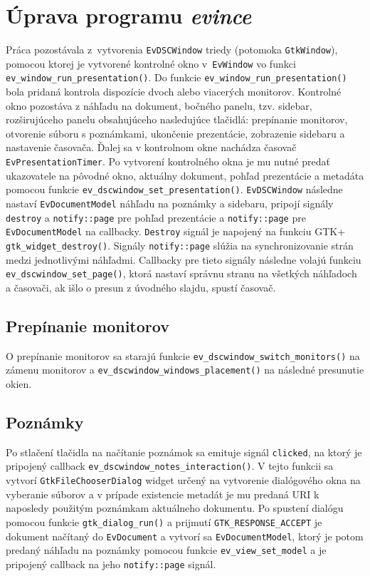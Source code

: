 \documentclass[12pt,oneside,final]{fithesis2}
\begin{document}
\chapter{Úprava programu \emph{evince}}
Práca pozostávala z~vytvorenia \texttt{EvDSCWindow} triedy (potomoka \texttt{GtkWindow}), pomocou ktorej je vytvorené kontrolné okno v~\texttt{EvWindow} vo funkci \texttt{ev\_window\_run\_presentation()}. Do funkcie \texttt{ev\_window\_run\_presentation()} bola pridaná kontrola dispozície dvoch alebo viacerých monitorov. Kontrolné okno pozostáva z náhľadu na dokument, bočného panelu, tzv. sidebar, rozširujúceho panelu obsahujúceho nasledujúce tlačidlá: prepínanie monitorov, otvorenie súboru s poznámkami, ukončenie prezentácie, zobrazenie sidebaru a nastavenie časovača. Ďalej sa v kontrolnom okne nachádza časovač \texttt{EvPresentationTimer}. Po vytvorení kontrolného okna je mu nutné predať ukazovatele na pôvodné okno, aktuálny dokument, pohľad prezentácie a metadáta pomocou funkcie \texttt{ev\_dscwindow\_set\_presentation()}. \texttt{EvDSCWindow} následne nastaví \texttt{EvDocumentModel} náhľadu na poznámky a sidebaru, pripojí signály \texttt{destroy} a \texttt{notify::page} pre pohľad prezentácie a \texttt{notify::page} pre \texttt{EvDocumentModel} na callbacky. \texttt{Destroy} signál je napojený na funkciu GTK+ \texttt{gtk\_widget\_destroy()}. Signály \texttt{notify::page} slúžia na synchronizovanie strán medzi jednotlivými náhľadmi. Callbacky pre tieto signály následne volajú funkciu \texttt{ev\_dscwindow\_set\_page()}, ktorá nastaví správnu stranu na všetkých náhľadoch a časovači, ak išlo o presun z úvodného slajdu, spustí časovač.
\section{Prepínanie monitorov}
O prepínanie monitorov sa starajú funkcie \texttt{ev\_dscwindow\_switch\_monitors()} na zámenu monitorov a \texttt{ev\_dscwindow\_windows\_placement()} na následné presunutie okien. %
\section{Poznámky}
Po stlačení tlačidla na načítanie poznámok sa emituje signál \texttt{clicked}, na ktorý je pripojený callback \texttt{ev\_dscwindow\_notes\_interaction()}. V tejto funkcii sa vytvorí \texttt{GtkFileChooserDialog} widget určený na vytvorenie dialógového okna na vyberanie súborov a v prípade existencie metadát je mu predaná URI k naposledy použitým poznámkam aktuálneho dokumentu. Po spustení dialógu pomocou funkcie \texttt{gtk\_dialog\_run()} a prijmutí \texttt{GTK\_RESPONSE\_ACCEPT} je dokument načítaný do \texttt{EvDocument} a vytvorí sa \texttt{EvDocumentModel}, ktorý je potom predaný náhľadu na poznámky pomocou funkcie \texttt{ev\_view\_set\_model} a je pripojený callback na jeho \texttt{notify::page} signál.
\end{document}
